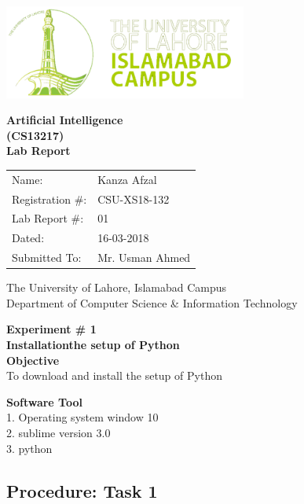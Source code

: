 \documentclass[11pt]{article}            %
\begin{document}
\begin{titlepage}
    \centering
  \vfill
    \includegraphics[width=8cm]{uni_logo.png} \\ 
	\vskip2cm
    {\bfseries\Large
	Artificial Intelligence \\ (CS13217)\\
	
	\vskip2cm
	Lab Report 
	 
	\vskip2cm
	}    

\begin{center}
\begin{tabular}{ l l  } 

Name: & Kanza Afzal \\ 
Registration \#: & CSU-XS18-132 \\ 
Lab Report \#: & 01 \\ 
 Dated:& 16-03-2018\\ 
Submitted To:& Mr. Usman Ahmed\\ 

\end{tabular}
\end{center}
    \vfill
    The University of Lahore, Islamabad Campus\\
Department of Computer Science \& Information Technology
\end{titlepage}


    
    {\bfseries\Large
\centering
	Experiment \# 1 \\

Installationthe setup of Python\\
	
	}    
 \vskip1cm
 \textbf {Objective}\\  To download and install the setup of  Python
 
 \textbf {Software Tool} \\
1. Operating system window 10 \\
2.  sublime version 3.0\\
3.  python\\

\subsection{Procedure: Task 1 }     
\end{document}
